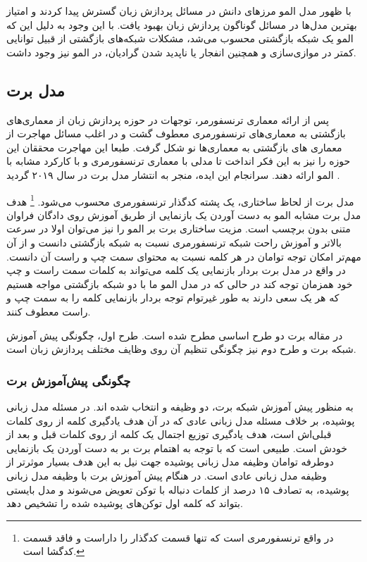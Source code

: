  با ظهور مدل المو مرز‌های دانش در مسائل پردازش زبان گسترش پیدا کردند و امتیاز بهترین مدل‌ها در مسائل گوناگون پردازش زبان بهبود یافت. با این وجود به دلیل این که المو یک شبکه بازگشتی محسوب می‌شد، مشکلات شبکه‌های بازگشتی از قبیل توانایی کمتر در موازی‌سازی و همچنین انفجار یا ناپدید شدن گرادیان، در المو نیز وجود داشت.  

\subsection{مدل برت}
پس از ارائه معماری ترنسفورمر، توجهات در حوزه پردازش زبان از معماری‌های بازگشتی به معماری‌های ترنسفورمری معطوف گشت و در اغلب مسائل مهاجرت از معماری های بازگشتی به معماری‌‌ها نو شکل گرفت. 
طبعا این مهاجرت محققان این حوزه را نیز به این فکر انداخت تا مدلی با معماری ترنسفورمری و با کارکرد مشابه با المو ارائه دهند. سرانجام این ایده، منجر به انتشار مدل برت در سال ۲۰۱۹ گردید
\cite{bert}
.

مدل برت از لحاظ ساختاری، یک پشته کدگذار ترنسفورمری محسوب می‌شود. 
\footnote{در واقع ترنسفورمری است که تنها قسمت کدگذار را داراست و فاقد قسمت کدگشا است.}
هدف مدل برت مشابه المو به دست آوردن یک بازنمایی از طریق آموزش روی دادگان فراوان متنی بدون برچسب است. مزیت ساختاری برت بر المو را نیز می‌توان اولا در سرعت بالاتر و آموزش راحت شبکه‌ ترنسفورمری نسبت به شبکه بازگشتی دانست و از آن مهم‌تر امکان توجه توامان
 در هر کلمه نسبت به محتوای سمت چپ و راست آن دانست. در واقع در مدل برت بردار بازنمایی یک کلمه می‌تواند به کلمات سمت راست و چپ خود همزمان توجه کند در حالی که در مدل المو ما با دو شبکه بازگشتی مواجه هستیم که هر یک سعی دارند به طور غیرتوام توجه بردار بازنمایی کلمه را به سمت چپ و راست معطوف کنند. 
 
 در مقاله برت دو طرح اساسی مطرح شده است. طرح اول، چگونگی پیش آموزش شبکه برت و طرح دوم نیز چگونگی تنظیم آن روی وظایف مختلف پردازش زبان است.
 
 \subsubsection{چگونگی پیش‌آموزش برت}
 به منظور پیش آموزش شبکه برت، دو وظیفه 
 و 
 انتخاب شده اند.
در مسئله مدل زبانی پوشیده، بر خلاف مسئله مدل زبانی عادی که در آن هدف یادگیری
کلمه از روی کلمات قبلی‌اش است، هدف یادگیری توزیع اجتمال یک کلمه از روی کلمات قبل و بعد از خودش است. طبیعی است که با توجه به اهتمام برت بر به دست آوردن یک بازنمایی دوطرفه توامان وظیفه مدل زبانی پوشیده جهت نیل به این هدف بسیار موثر‌تر از وظیفه مدل زبانی عادی است. در هنگام پیش آموزش برت با وظیفه مدل زبانی پوشیده، به تصادف ۱۵ درصد از کلمات دنباله با توکن 
تعویض می‌شوند و مدل بایستی بتواند که کلمه اول توکن‌های پوشیده شده را تشخیص دهد. 


